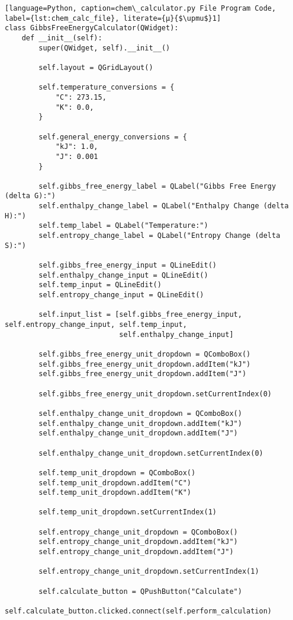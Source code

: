 \begin{lstlisting}[language=Python, caption=chem\_calculator.py File Program Code, label={lst:chem_calc_file}, literate={μ}{$\upmu$}1]
class GibbsFreeEnergyCalculator(QWidget):
    def __init__(self):
        super(QWidget, self).__init__()

        self.layout = QGridLayout()

        self.temperature_conversions = {
            "C": 273.15,
            "K": 0.0,
        }

        self.general_energy_conversions = {
            "kJ": 1.0,
            "J": 0.001
        }

        self.gibbs_free_energy_label = QLabel("Gibbs Free Energy (delta G):")
        self.enthalpy_change_label = QLabel("Enthalpy Change (delta H):")
        self.temp_label = QLabel("Temperature:")
        self.entropy_change_label = QLabel("Entropy Change (delta S):")

        self.gibbs_free_energy_input = QLineEdit()
        self.enthalpy_change_input = QLineEdit()
        self.temp_input = QLineEdit()
        self.entropy_change_input = QLineEdit()

        self.input_list = [self.gibbs_free_energy_input, self.entropy_change_input, self.temp_input,
                           self.enthalpy_change_input]

        self.gibbs_free_energy_unit_dropdown = QComboBox()
        self.gibbs_free_energy_unit_dropdown.addItem("kJ")
        self.gibbs_free_energy_unit_dropdown.addItem("J")

        self.gibbs_free_energy_unit_dropdown.setCurrentIndex(0)

        self.enthalpy_change_unit_dropdown = QComboBox()
        self.enthalpy_change_unit_dropdown.addItem("kJ")
        self.enthalpy_change_unit_dropdown.addItem("J")

        self.enthalpy_change_unit_dropdown.setCurrentIndex(0)

        self.temp_unit_dropdown = QComboBox()
        self.temp_unit_dropdown.addItem("C")
        self.temp_unit_dropdown.addItem("K")

        self.temp_unit_dropdown.setCurrentIndex(1)

        self.entropy_change_unit_dropdown = QComboBox()
        self.entropy_change_unit_dropdown.addItem("kJ")
        self.entropy_change_unit_dropdown.addItem("J")

        self.entropy_change_unit_dropdown.setCurrentIndex(1)

        self.calculate_button = QPushButton("Calculate")
        self.calculate_button.clicked.connect(self.perform_calculation)


\end{lstlisting}

